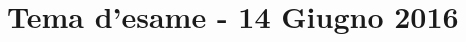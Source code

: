 \documentclass[\main/main.tex]{subfiles}
\begin{document}
\section{Tema d'esame - 14 Giugno 2016}


\clearpage

\clearpage

\clearpage

\clearpage

\clearpage

\clearpage

\end{document}
